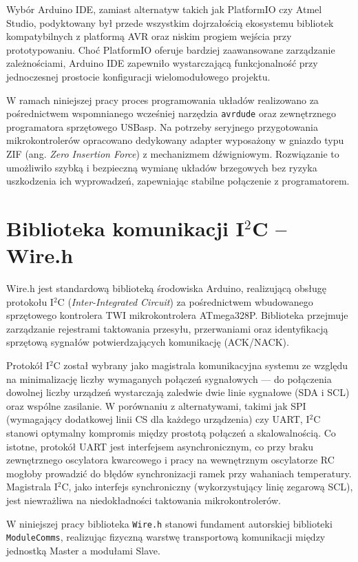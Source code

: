 \documentclass{SGGW-thesis}
\begin{document}
Wybór Arduino IDE, zamiast alternatyw takich jak PlatformIO czy Atmel Studio, podyktowany był przede wszystkim dojrzałością ekosystemu bibliotek kompatybilnych z platformą AVR oraz niskim progiem wejścia przy prototypowaniu. Choć PlatformIO oferuje bardziej zaawansowane zarządzanie zależnościami, Arduino IDE zapewniło wystarczającą funkcjonalność przy jednoczesnej prostocie konfiguracji wielomodułowego projektu.

W ramach niniejszej pracy proces programowania układów realizowano za pośrednictwem wspomnianego wcześniej narzędzia \texttt{avrdude} oraz zewnętrznego programatora sprzętowego USBasp. Na potrzeby seryjnego przygotowania mikrokontrolerów opracowano dedykowany adapter wyposażony w gniazdo typu ZIF (ang. \textit{Zero Insertion Force}) z mechanizmem dźwigniowym. Rozwiązanie to umożliwiło szybką i bezpieczną wymianę układów brzegowych bez ryzyka uszkodzenia ich wyprowadzeń, zapewniając stabilne połączenie z programatorem.

\section{Biblioteka komunikacji I$^2$C -- Wire.h}
Wire.h \cite{arduino_wire} jest standardową biblioteką środowiska Arduino, realizującą obsługę protokołu I$^2$C (\textit{Inter-Integrated Circuit}) za pośrednictwem wbudowanego sprzętowego kontrolera TWI mikrokontrolera ATmega328P. Biblioteka przejmuje zarządzanie rejestrami taktowania przesyłu, przerwaniami oraz identyfikacją sprzętową sygnałów potwierdzających komunikację (ACK/NACK).

Protokół I$^2$C został wybrany jako magistrala komunikacyjna systemu ze względu na minimalizację liczby wymaganych połączeń sygnałowych --- do połączenia dowolnej liczby urządzeń wystarczają zaledwie dwie linie sygnałowe (SDA i SCL) oraz wspólne zasilanie. W porównaniu z alternatywami, takimi jak SPI (wymagający dodatkowej linii CS dla każdego urządzenia) czy UART, I$^2$C stanowi optymalny kompromis między prostotą połączeń a skalowalnością. Co istotne, protokół UART jest interfejsem asynchronicznym, co przy braku zewnętrznego oscylatora kwarcowego i pracy na wewnętrznym oscylatorze RC mogłoby prowadzić do błędów synchronizacji ramek przy wahaniach temperatury. Magistrala I$^2$C, jako interfejs synchroniczny (wykorzystujący linię zegarową SCL), jest niewrażliwa na niedokładności taktowania mikrokontrolerów.

W niniejszej pracy biblioteka \texttt{Wire.h} stanowi fundament autorskiej biblioteki \texttt{ModuleComms}, realizując fizyczną warstwę transportową komunikacji między jednostką Master a modułami Slave.
\end{document}
